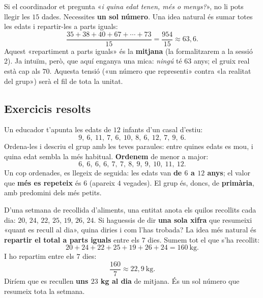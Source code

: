 \begin{exemple}
Si el coordinador et pregunta «\emph{i quina edat tenen, més o menys?}», no li pots
llegir les $15$ dades. Necessites \textbf{un sol número}. Una idea natural és sumar
totes les edats i repartir-les a parts iguals:
\[
\frac{35+38+40+67+\cdots+73}{15}=\frac{\num{954}}{15}\approx 63,6.
\]
Aquest «repartiment a parts iguals» és la \textbf{mitjana} (la formalitzarem a la
sessió 2). Ja intuïm, però, que aquí enganya una mica: \emph{ningú} té $63$ anys; el
gruix real està cap als $70$. Aquesta tensió («un número que representi» contra «la
realitat del grup») serà el fil de tota la unitat.
\end{exemple}

\subsection{Exercicis resolts}

\begin{exresolt}
Un educador t'apunta les edats de $12$ infants d'un casal d'estiu:
\[
9,\ 6,\ 11,\ 7,\ 6,\ 10,\ 8,\ 6,\ 12,\ 7,\ 9,\ 6.
\]
Ordena-les i descriu el grup amb les teves paraules: entre quines edats es mou, i
quina edat sembla la més habitual.
\solucio
\textbf{Ordenem} de menor a major:
\[
6,\ 6,\ 6,\ 6,\ 7,\ 7,\ 8,\ 9,\ 9,\ 10,\ 11,\ 12.
\]
Un cop ordenades, es llegeix de seguida: les edats van \textbf{de $6$ a $12$ anys};
el valor que \textbf{més es repeteix} és $6$ (apareix $4$ vegades). El grup és, doncs,
de \textbf{primària}, amb predomini dels més petits.
\end{exresolt}

\begin{exresolt}
D'una setmana de recollida d'aliments, una entitat anota els quilos recollits cada
dia: $20$, $24$, $22$, $25$, $19$, $26$, $24$. Si haguessis de dir \textbf{una sola
xifra} que resumeixi «quant es recull al dia», quina diries i com l'has trobada?
\solucio
La idea més natural és \textbf{repartir el total a parts iguals} entre els $7$ dies.
Sumem tot el que s'ha recollit:
\[
20+24+22+25+19+26+24=\num{160}\ \text{kg}.
\]
I ho repartim entre els $7$ dies:
\[
\frac{160}{7}\approx 22,9\ \text{kg}.
\]
Diríem que es recullen \textbf{uns $23$ kg al dia} de mitjana. És un sol número que
resumeix tota la setmana.
\end{exresolt}


